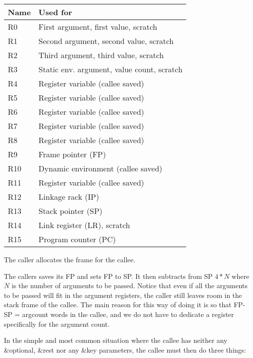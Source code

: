 \begin{tabular}{|l|l|}
\hline
Name & Used for\\
\hline
\hline
R0 & First argument, first value, scratch\\
R1 & Second argument, second value, scratch \\
R2 & Third argument, third value, scratch \\
R3 & Static env. argument, value count, scratch \\
R4 & Register variable (callee saved) \\
R5 & Register variable (callee saved) \\
R6 & Register variable (callee saved) \\
R7 & Register variable (callee saved) \\
R8 & Register variable (callee saved) \\
R9 & Frame pointer (FP) \\
R10 & Dynamic environment (callee saved) \\
R11 & Register variable (callee saved)\\
R12 & Linkage rack (IP)\\
R13 & Stack pointer (SP)\\
R14 & Link register (LR), scratch \\
R15 & Program counter (PC) \\
\hline
\end{tabular}


The caller allocates the frame for the callee. 

The callers saves its FP and sets FP to SP.  It then subtracts from SP
$4*N$ where $N$ is the number of arguments to be passed.  Notice that even
if all the arguments to be passed will fit in the argument registers,
the caller still leaves room in the stack frame of the callee.  The
main reason for this way of doing it is so that FP-SP = argcount words in
the callee, and we do not have to dedicate a register specifically for
the argument count.

In the simple and most common situation where the callee has neither
any \&optional, \&rest nor any \&key parameters, the callee must then
do three things:

